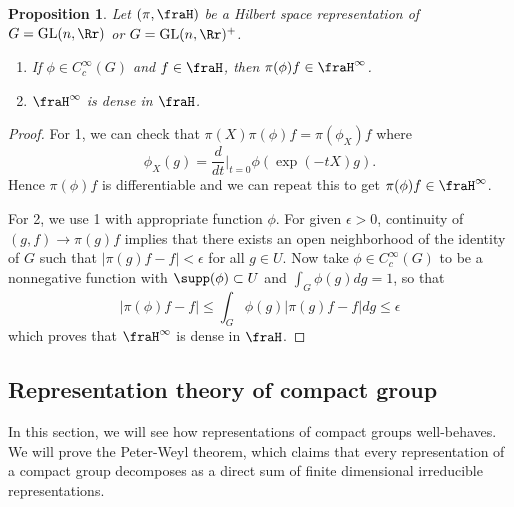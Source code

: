 \documentclass{article}
\newcommand{\GL}{\mathrm{GL}}
\newtheorem{proposition}{Proposition}[section]
\begin{document}
\begin{proposition}
Let $(\pi, \fraH)$ be a Hilbert space representation of $G = \GL(n, \Rr)$ or $G = \GL(n, \Rr)^{+}$. 
\begin{enumerate}
\item If $\phi\in C_{c}^{\infty}(G)$ and $f\in \fraH$, then $\pi(\phi)f \in \fraH^{\infty}$. 
\item $\fraH^{\infty}$ is dense in $\fraH$. 
\end{enumerate}
\end{proposition}
\begin{proof}
For 1, we can check that $\pi(X)\pi(\phi)f = \pi(\phi_{X})f$ where $$\phi_{X}(g) = \frac{d}{dt}\Big|_{t=0} \phi(\exp(-tX)g).$$ 
Hence $\pi(\phi)f$ is differentiable and we can repeat this to get $\pi(\phi)f\in \fraH^{\infty}$. 

For 2, we use 1 with appropriate function $\phi$. For given $\epsilon>0$, continuity of $(g, f)\to \pi(g)f$ implies that there exists an open neighborhood of the identity of $G$ such that $|\pi(g)f - f|<\epsilon$ for all $g\in U$. 
Now take $\phi\in C_{c}^{\infty}(G)$ to be a nonnegative function with $\supp(\phi)\subset U$ and $\int_{G}\phi(g) dg = 1$, so that 
$$
|\pi(\phi)f - f| \leq \int_{G} \phi(g)|\pi(g)f - f|dg \leq \epsilon
$$
which proves that $\fraH^{\infty}$ is dense in $\fraH$. 
\end{proof}








\subsection{Representation theory of compact group}
In this section, we will see how representations of compact groups well-behaves. We will prove the Peter-Weyl theorem, which claims that every representation of a compact group decomposes as a direct sum of finite dimensional irreducible representations. 
\end{document}
